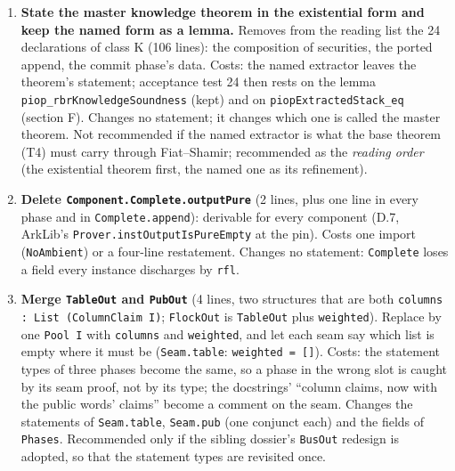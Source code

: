 \begin{enumerate}
\item \textbf{State the master knowledge theorem in the existential form and keep the named form as a lemma.} Removes from the reading list the 24 declarations of class K (106 lines): the composition of securities, the ported append, the commit phase's data. Costs: the named extractor leaves the theorem's statement; acceptance test 24 then rests on the lemma \texttt{piop\_\allowbreak{}rbrKnowledgeSoundness} (kept) and on \texttt{piopExtractedStack\_\allowbreak{}eq} (section F). Changes no statement; it changes which one is called the master theorem. Not recommended if the named extractor is what the base theorem (T4) must carry through Fiat–Shamir; recommended as the \emph{reading order} (the existential theorem first, the named one as its refinement).
\item \textbf{Delete \texttt{C\allowbreak{}o\allowbreak{}m\allowbreak{}p\allowbreak{}o\allowbreak{}n\allowbreak{}e\allowbreak{}n\allowbreak{}t\allowbreak{}.\allowbreak{}C\allowbreak{}o\allowbreak{}m\allowbreak{}p\allowbreak{}l\allowbreak{}e\allowbreak{}t\allowbreak{}e\allowbreak{}.\allowbreak{}o\allowbreak{}u\allowbreak{}t\allowbreak{}p\allowbreak{}u\allowbreak{}t\allowbreak{}P\allowbreak{}u\allowbreak{}r\allowbreak{}e}} (2 lines, plus one line in every phase and in \texttt{Complete.\allowbreak{}append}): derivable for every component (D.7, ArkLib's \texttt{Prover.\allowbreak{}instOutputIsPureEmpty} at the pin). Costs one import (\texttt{NoAmbient}) or a four-line restatement. Changes no statement: \texttt{Complete} loses a field every instance discharges by \texttt{rfl}.
\item \textbf{Merge \texttt{TableOut} and \texttt{PubOut}} (4 lines, two structures that are both \texttt{c\allowbreak{}o\allowbreak{}l\allowbreak{}u\allowbreak{}m\allowbreak{}n\allowbreak{}s\allowbreak{} :\allowbreak{} L\allowbreak{}i\allowbreak{}s\allowbreak{}t\allowbreak{} (\allowbreak{}C\allowbreak{}o\allowbreak{}l\allowbreak{}u\allowbreak{}m\allowbreak{}n\allowbreak{}C\allowbreak{}l\allowbreak{}a\allowbreak{}i\allowbreak{}m\allowbreak{} I\allowbreak{})}; \texttt{FlockOut} is \texttt{TableOut} plus \texttt{weighted}). Replace by one \texttt{Pool I} with \texttt{columns} and \texttt{weighted}, and let each seam say which list is empty where it must be (\texttt{Seam.\allowbreak{}table}: \texttt{weighted = []}). Costs: the statement types of three phases become the same, so a phase in the wrong slot is caught by its seam proof, not by its type; the docstrings' \enquote{column claims, now with the public words' claims} become a comment on the seam. Changes the statements of \texttt{Seam.\allowbreak{}table}, \texttt{Seam.\allowbreak{}pub} (one conjunct each) and the fields of \texttt{Phases}. Recommended only if the sibling dossier's \texttt{BusOut} redesign is adopted, so that the statement types are revisited once.

\end{enumerate}
